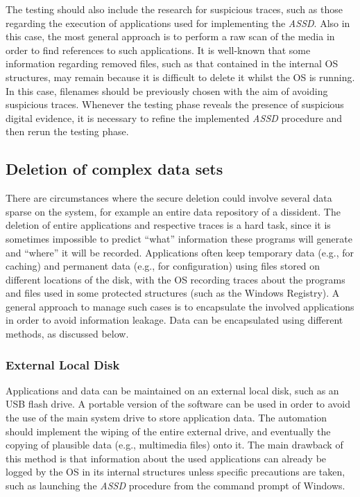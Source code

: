 \documentclass[10pt, conference, compsocconf]{IEEEtran}
\newcommand{\assd}{\emph{ASSD}\xspace}
\begin{document}
The testing should also include the research for suspicious traces, such as those regarding the execution of applications used for implementing the \assd. Also in this case, the most general approach is to perform a raw scan of the media in order to find references to such applications. It is well-known that some information regarding removed files, such as that contained in the internal OS structures, may remain because it is difficult to delete it whilst the OS is running. In this case, filenames should be previously chosen with the aim of avoiding suspicious traces. Whenever the testing phase reveals the presence of suspicious digital evidence, it is necessary to refine the implemented \assd procedure and then rerun the testing phase.


\subsection{Deletion of complex data sets}
\label{par:env}
There are circumstances where the secure deletion could involve several data sparse on the system, for example an entire data repository of a dissident.
The deletion of entire applications and respective traces is a hard task, since it is sometimes impossible to predict ``what'' information these programs will generate and ``where'' it will be recorded. Applications often keep temporary data (e.g., for caching) and permanent data (e.g., for configuration) using files stored on different locations of the disk, with the OS recording traces about the programs and files used in some protected structures (such as the Windows Registry). A general approach to manage such cases is to encapsulate the involved applications in order to avoid information leakage. Data can be encapsulated using different methods, as discussed below.

\subsubsection{External Local Disk}
Applications and data can be maintained on an external local disk, such as an USB flash drive. A portable version of the software can be used in order to avoid the use of the main system drive to store application data. The automation should implement the wiping of the entire external drive, and eventually the copying of plausible data (e.g., multimedia files) onto it.
The main drawback of this method is that information about the used applications can already be logged by the OS in its internal structures unless specific precautions are taken, such as launching the \assd procedure from the command prompt of Windows.
\end{document}
